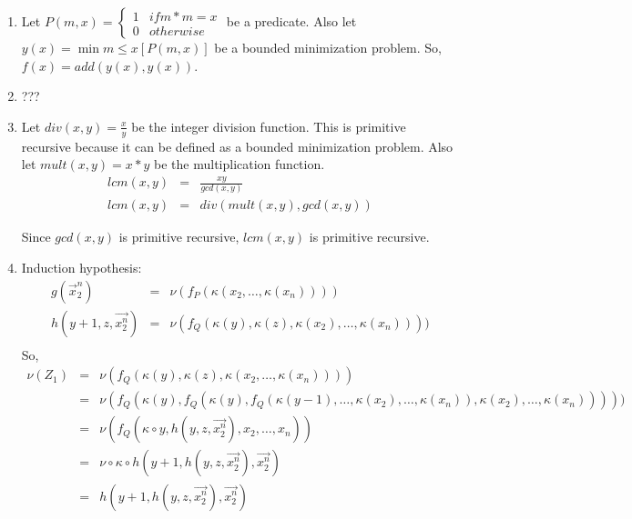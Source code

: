\documentclass[10pt]{article}
\begin{document}
\begin{enumerate}
\item %
  Let 
  \begin{math}
    P(m, x) = \left\{ \begin{array}{ll}
      1 & if m * m = x \\
      0 & otherwise
        \end{array} \right.
  \end{math} be a predicate. Also let $y(x) = \min m \le x[P(m, x)]$ be a
  bounded minimization problem.  So, $f(x) = add(y(x), y(x))$.

\item %
  ???

\item %
  Let $div(x, y) = \frac{x}{y}$ be the integer division function.  This is
  primitive recursive because it can be defined as a bounded minimization
  problem.  Also let $mult(x, y) = x * y$ be the multiplication function.
  \begin{eqnarray*}
    lcm(x, y) & = & \frac{xy}{gcd(x, y)} \\
    lcm(x, y) & = & div(mult(x, y), gcd(x, y)) 
  \end{eqnarray*}
  
  Since $gcd(x, y)$ is primitive recursive, $lcm(x, y)$ is primitive recursive.

\item %
  Induction hypothesis: 
    \begin{eqnarray*}
      g(\vec{x}_2^n)         & = & \nu(f_P(\kappa(x_2,\ldots,\kappa(x_n)))) \\
      h(y+1, z, \vec{x_2^n}) & = & \nu(f_Q(\kappa(y), \kappa(z), 
                                           \kappa(x_2),\ldots,\kappa(x_n)))) \\
    \end{eqnarray*}
  So,
    \begin{eqnarray*}
      \nu(Z_1) & = & \nu(f_Q(\kappa(y), \kappa(z), 
                             \kappa(x_2,\ldots,\kappa(x_n)))) \\
               & = & \nu(f_Q(\kappa(y), f_Q(\kappa(y), f_Q(\kappa(y-1), 
                                               \ldots, 
                                               \kappa(x_2),\ldots,\kappa(x_n)), 
                             \kappa(x_2),\ldots,\kappa(x_n))))) \\
               & = & \nu(f_Q(\kappa\circ y, h(y, z, \vec{x_2^n}), 
                                         x_2,\ldots,x_n)) \\
               & = & \nu \circ \kappa \circ h(y+1, h(y, z, \vec{x_2^n}), 
                                              \vec{x_2^n}) \\
               & = & h(y+1, h(y, z, \vec{x_2^n}), \vec{x_2^n})
    \end{eqnarray*}


\end{enumerate}
\end{document}
